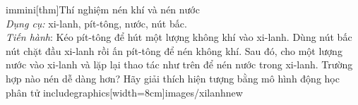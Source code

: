 \begin{ex}
	immini[thm]{Thí nghiệm nén khí và nén nước\\
		\textit{Dụng cụ:} xi-lanh, pít-tông, nước, nút bấc.\\
		\textit{Tiến hành}: Kéo pít-tông để hút một lượng không khí vào xi-lanh. Dùng nút bấc nút chặt đầu xi-lanh rồi ấn pít-tông để nén không khí.
		Sau đó, cho một lượng nước vào xi-lanh và lặp lại thao tác như trên để nén nước trong xi-lanh. Trường hợp nào nén dễ dàng hơn? Hãy giải thích hiện tượng bằng mô hình động học phân tử}{\vspace*{-.5 cm} includegraphics[width=8cm]{images/xilanhnew}}
	
\end{ex}
